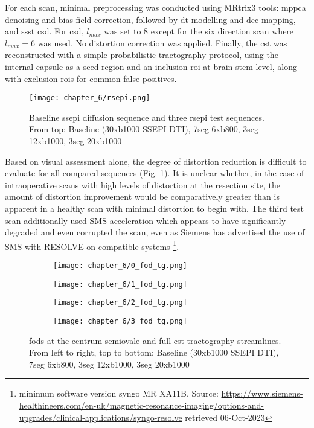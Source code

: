 For each scan, minimal preprocessing was conducted using MRtrix3\autocite{Tournier2019} tools:
\Gls{mppca} denoising and bias field correction, followed by \gls{dt} modelling and \gls{dec} mapping, and \gls{ssst} \gls{csd}.
For \gls{csd}, $l_{max}$ was set to 8 except for the six direction scan where $l_{max}=6$ was used.
No distortion correction was applied.
Finally, the \gls{cst} was reconstructed with a simple probabilistic tractography protocol, using the internal capsule as a seed region and an inclusion \gls{roi} at brain stem level, along with exclusion \glspl{roi} for common false positives.

\begin{figure}[h!]
  \centering
  \texttt{[image: chapter\_6/rsepi.png]}
  \caption{Baseline \gls{ssepi} diffusion sequence and three \gls{rsepi} test sequences. From top: Baseline (30xb1000 SSEPI DTI), 7seg 6xb800, 3seg 12xb1000, 3seg 20xb1000}
  \label{fig:rsepi}
\end{figure}

Based on visual assessment alone, the degree of distortion reduction is difficult to evaluate for all compared sequences (Fig. \ref{fig:rsepi}).
It is unclear whether, in the case of intraoperative scans with high levels of distortion at the resection site, the amount of distortion improvement would be comparatively greater than is apparent in a healthy scan with minimal distortion to begin with.
The third test scan additionally used SMS acceleration which appears to have significantly degraded and even corrupted the scan, even as Siemens has advertised the use of SMS with RESOLVE on compatible systems
\footnote[2]{minimum software version syngo MR XA11B. Source: \url{https://www.siemens-healthineers.com/en-uk/magnetic-resonance-imaging/options-and-upgrades/clinical-applications/syngo-resolve} retrieved 06-Oct-2023}.


\begin{figure}[h!]
  \centering
  \begin{subfigure}{0.5\textwidth}
    \texttt{[image: chapter\_6/0\_fod\_tg.png]}
  \end{subfigure}%
  \begin{subfigure}{0.5\textwidth}
    \texttt{[image: chapter\_6/1\_fod\_tg.png]}
  \end{subfigure}
  \begin{subfigure}{0.5\textwidth}
    \texttt{[image: chapter\_6/2\_fod\_tg.png]}
  \end{subfigure}%
  \begin{subfigure}{0.5\textwidth}
    \texttt{[image: chapter\_6/3\_fod\_tg.png]}
  \end{subfigure}
  \caption{\glspl{fod} at the centrum semiovale and full \gls{cst} tractography streamlines. From left to right, top to bottom: Baseline (30xb1000 SSEPI DTI), 7seg 6xb800, 3seg 12xb1000, 3seg 20xb1000}
  \label{fig:rsepi-fod}
\end{figure}

